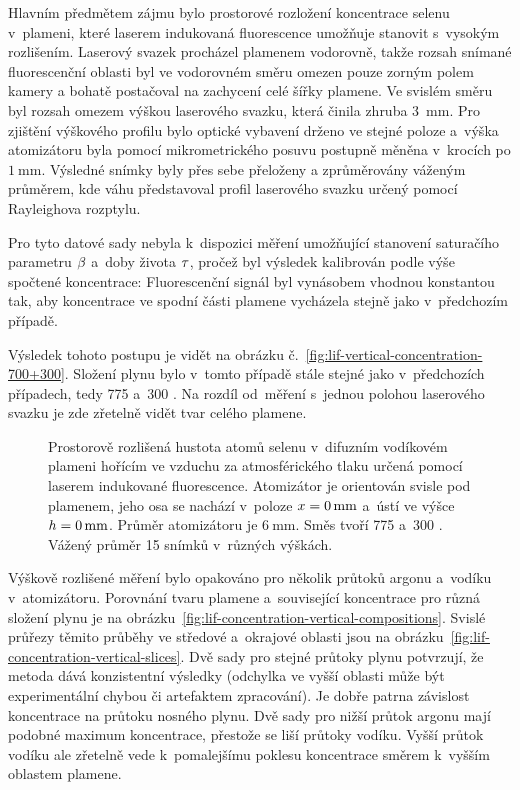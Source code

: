 Hlavním předmětem zájmu bylo prostorové rozložení koncentrace selenu
v~plameni, které laserem indukovaná fluorescence umožňuje stanovit
s~vysokým rozlišením.
Laserový svazek procházel plamenem vodorovně, takže
rozsah snímané fluorescenční oblasti byl ve vodorovném směru omezen pouze
zorným polem kamery a bohatě postačoval na zachycení celé šířky plamene.
Ve svislém směru byl rozsah omezem výškou laserového svazku, která
činila zhruba \SI{3}{\milli\metre}.
Pro zjištění výškového profilu bylo optické vybavení drženo ve stejné
poloze a~výška atomizátoru byla pomocí mikrometrického posuvu postupně
měněna v~krocích po $\SI{1}{\milli\metre}$.
Výsledné snímky byly přes sebe přeloženy a zprůměrovány váženým průměrem,
kde váhu představoval profil laserového svazku určený pomocí Rayleighova
rozptylu.

Pro tyto datové sady nebyla k~dispozici měření umožňující stanovení
saturačího parametru $\beta$ a~doby života $\tau$,
pročež byl výsledek kalibrován podle výše spočtené koncentrace:
Fluorescenční signál byl vynásobem vhodnou konstantou tak,
aby koncentrace ve spodní části plamene vycházela stejně
jako v~předchozím případě.

Výsledek tohoto postupu je vidět na obrázku
č.~\ref{fig:lif-vertical-concentration-700+300}.
Složení plynu bylo v~tomto případě stále stejné jako v~předchozích případech,
tedy \SI{775}{\sccm}  a~\SI{300}{\sccm} .
Na rozdíl od~měření s~jednou polohou laserového svazku je zde zřetelně vidět
tvar celého plamene.

\begin{figure}[htp]
	\centering
	
	\caption{Prostorově rozlišená hustota atomů selenu v~difuzním
		vodíkovém plameni hořícím ve vzduchu za atmosférického tlaku
		určená pomocí laserem indukované fluorescence.
		Atomizátor je orientován svisle pod plamenem,
		jeho osa se nachází v~poloze $x = \SI{0}{\milli\metre}$
		a~ústí ve výšce $h = \SI{0}{\milli\metre}$.
		Průměr atomizátoru je $\SI{6}{\milli\metre}$.
		Směs tvoří \SI{775}{\sccm}  a~\SI{300}{\sccm} .
		Vážený průměr 15 snímků v~různých výškách.}
	\label{fig:lif-concentration-vertical-700+300}
\end{figure}

Výškově rozlišené měření bylo opakováno pro několik průtoků argonu
a~vodíku v~atomizátoru.
Porovnání tvaru plamene a~související koncentrace pro různá složení
plynu je na obrázku~\ref{fig:lif-concentration-vertical-compositions}.
Svislé průřezy těmito průběhy ve středové a~okrajové oblasti jsou
na obrázku~\ref{fig:lif-concentration-vertical-slices}.
Dvě sady pro stejné průtoky plynu potvrzují,
že metoda dává konzistentní výsledky
(odchylka ve vyšší oblasti může být experimentální chybou
či artefaktem zpracování).
Je dobře patrna závislost koncentrace na průtoku nosného plynu.
Dvě sady pro nižší průtok argonu mají podobné maximum koncentrace,
přestože se liší průtoky vodíku.
Vyšší průtok vodíku ale zřetelně vede k~pomalejšímu poklesu koncentrace
směrem k~vyšším oblastem plamene.

